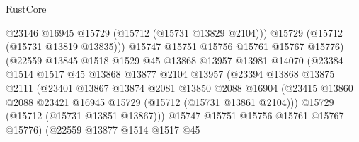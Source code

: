 \begin{lexlean}{RustCore}
\begin{coremodule}
                                    @23146
                                    @16945
                                    @15729
                                    (@15712 (@15731 @13829 @2104)))
                                  @15729
                                  (@15712 (@15731 @13819 @13835)))
                                @15747
                                @15751
                                @15756
                                @15761
                                @15767
                                @15776)
                              (@22559
                                @13845
                                @1518
                                @1529
                                @45
                                @13868
                                @13957
                                @13981
                                @14070
                                (@23384
                                  @1514
                                  @1517
                                  @45
                                  @13868
                                  @13877
                                  @2104
                                  @13957
                                  (@23394
                                    @13868
                                    @13875
                                    @2111
                                    (@23401
                                      @13867
                                      @13874
                                      @2081
                                      @13850
                                      @2088
                                      @16904
                                      (@23415
                                        @13860
                                        @2088
                                        @23421
                                        @16945
                                        @15729
                                        (@15712 (@15731 @13861 @2104)))
                                      @15729
                                      (@15712 (@15731 @13851 @13867)))
                                    @15747
                                    @15751
                                    @15756
                                    @15761
                                    @15767
                                    @15776)
                                  (@22559
                                    @13877
                                    @1514
                                    @1517
                                    @45

\end{coremodule}
\end{lexlean}
